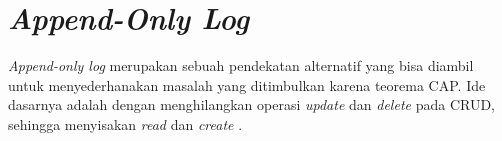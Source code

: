 \section{\textit{Append-Only Log}}

\textit{Append-only log} merupakan sebuah pendekatan alternatif yang bisa diambil untuk menyederhanakan masalah yang ditimbulkan karena teorema CAP. Ide dasarnya adalah dengan menghilangkan operasi \textit{update} dan \textit{delete} pada CRUD, sehingga menyisakan \textit{read} dan \textit{create} \parencite{howToBeatCAP}.



